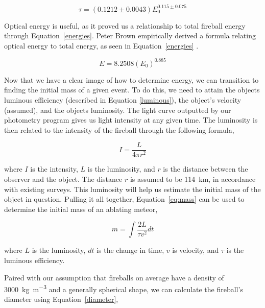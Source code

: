 \begin{equation}
 \tau = (0.1212 \pm 0.0043)E_0^{0.115 \pm 0.075} 
 \label{luminous}
\end{equation}

Optical energy is useful, as it proved us a relationship to total fireball energy through Equation~\ref{energies}.
Peter Brown empirically derived a formula relating optical energy to total energy, as seen in Equation~\ref{energies} \cite{brown_p_flux_2002}.

\begin{equation}
E = 8.2508(E_0)^{0.885}
 \label{energies}
\end{equation}

Now that we have a clear image of how to determine energy, we can transition to finding the initial mass of a given event.
To do this, we need to attain the objects luminous efficiency (described in Equation \ref{luminous}), the object's velocity (assumed), and the objects luminosity.
The light curve outputted by our photometry program gives us light intensity at any given time.
The luminosity is then related to the intensity of the fireball through the following formula,

\begin{equation}
 I = \frac{L}{4 \pi r^2}
\label{intensity}
\end{equation}

where $I$ is the intensity, $L$ is the luminosity, and $r$ is the distance between the observer and the object. 
The distance $r$ is assumed to be \SI{114}{\kilo\meter}, in accordance with existing surveys.
This luminosity will help us estimate the initial mass of the object in question.
Pulling it all together, Equation~\ref{eq:mass} can be used to determine the initial mass of an ablating meteor,

\begin{equation}
m = \int \frac{2L}{\tau v^2} dt
\label{eq:mass}
\end{equation}

where $L$ is the luminosity, $dt$ is the change in time, $v$ is velocity, and $\tau$ is the luminous efficiency. 



Paired with our assumption that fireballs on average have a density of \SI{3000}{\kilo\gram \per \meter^{3}} and a generally spherical shape, we can calculate the fireball's diameter using Equation~\ref{diameter},

